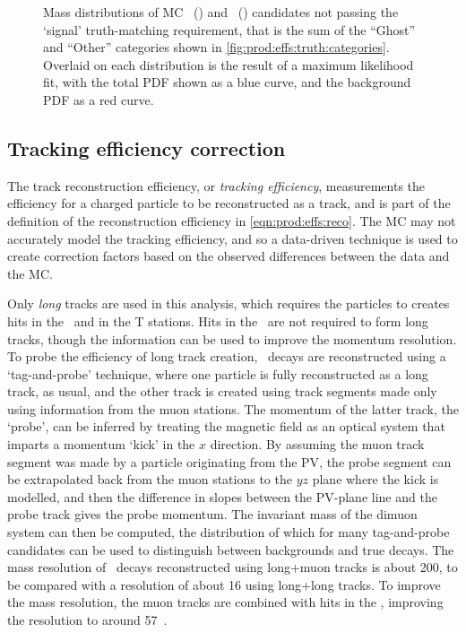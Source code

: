 \begin{figure}
\begin{subfigure}[b]{0.5\textwidth}
    \caption{\DpToKpipi}
    \label{fig:prod:effs:truth:fit:DpToKpipi}
  \end{subfigure}
  \caption{%
    Mass distributions of \ac{MC} 
    \PDzero~() and 
    \PDplus~() candidates not 
    passing the `signal' truth-matching requirement, that is the sum of the 
    ``Ghost'' and ``Other'' categories shown in 
    \cref{fig:prod:effs:truth:categories}.
    Overlaid on each distribution is the result of a maximum likelihood fit, 
    with the total \acl{PDF} shown as a blue curve, and the background 
    \acl{PDF} as a red curve.
  }
  \label{fig:prod:effs:truth:fit}
\end{figure}

\subsection{Tracking efficiency correction}
\label{chap:prod:effs:tracking}

The track reconstruction efficiency, or \emph{tracking efficiency}, 
measurements the efficiency for a charged particle to be reconstructed as a 
track, and is part of the definition of the reconstruction efficiency in 
\cref{eqn:prod:effs:reco}.
The \ac{MC} may not accurately model the tracking efficiency, and so a 
data-driven technique is used to create correction factors based on the 
observed differences between the data and the \ac{MC}.

Only \emph{long} tracks are used in this analysis, which requires the particles 
to creates hits in the \velo\ and in the T stations.
Hits in the \ttracker\ are not required to form long tracks, though the 
information can be used to improve the momentum resolution.
To probe the efficiency of long track creation, \JpsiTomumu\ decays are 
reconstructed using a `tag-and-probe' technique, where one particle is fully 
reconstructed as a long track, as usual, and the other track is created using 
track segments made only using information from the muon stations.
The momentum of the latter track, the `probe', can be inferred by treating the 
magnetic field as an optical system that imparts a momentum `kick' in the $x$ 
direction.
By assuming the muon track segment was made by a particle originating from the 
\ac{PV}, the probe segment can be extrapolated back from the muon stations to 
the $yz$ plane where the kick is modelled, and then the difference in slopes 
between the \ac{PV}-plane line and the probe track gives the probe momentum.
The invariant mass of the dimuon system can then be computed, the distribution 
of which for many tag-and-probe candidates can be used to distinguish between 
backgrounds and true \PJpsi decays.
The mass resolution of \JpsiTomumu\ decays reconstructed using long+muon tracks 
is about \SI{200}{\MeVcc}, to be compared with a resolution of about 
\SI{16}{\MeVcc} using long+long tracks.
To improve the mass resolution, the muon tracks are combined with hits in the 
\ttracker, improving the resolution to around 
\SI{57}{\MeVcc}~\cite{Aaij:2014pwa,DeCian:2013zua}.

